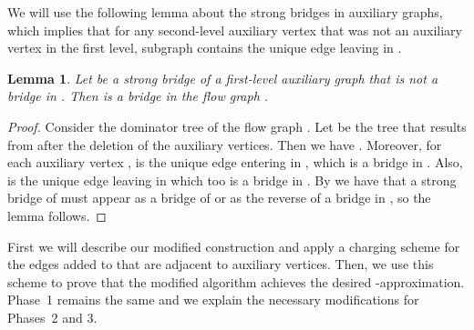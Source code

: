 \documentclass[11pt]{article}
\newtheorem{lemma}[theorem]{Lemma}
\begin{document}
We will use the following lemma about the strong bridges in auxiliary graphs,
which implies that for any second-level auxiliary vertex  that was not an auxiliary vertex in the first level,
subgraph  contains the unique edge leaving  in .

\begin{lemma}
\label{lemma:auxiliary-graph-strong-bridges}
Let  be a strong bridge of a first-level auxiliary graph  that is not a bridge in . Then  is a bridge in the flow graph .
\end{lemma}
\begin{proof}
Consider the dominator tree  of the flow graph . Let  be the tree that results from  after the deletion of the auxiliary vertices.
Then we have .
Moreover, for each auxiliary vertex ,  is the unique edge entering  in , which is a bridge in .
Also,  is the unique edge leaving  in  which too is a bridge in .
By \cite{Italiano2012} we have that a strong bridge of  must appear as a bridge of  or as the reverse of a bridge in , so the lemma follows.
\end{proof}

First we will describe our modified construction and apply a charging scheme for the edges added to  that are adjacent to auxiliary vertices.
Then, we use this scheme to prove that the modified algorithm achieves the desired -approximation.
Phase~1 remains the same and we explain the necessary modifications for Phases~2 and 3.
\end{document}
